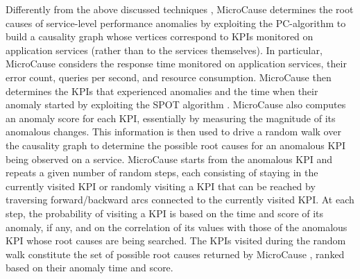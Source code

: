 {%
Differently from the above discussed techniques \cite{29_Wang2018_CloudRanger,07_Ma2019_MSRank,08_Ma2020_AutoMAP,25_Ma2020_MSRankExtended}, MicroCause \cite{05_Meng2020_RootCausesMicroservices} determines the root causes of service-level performance anomalies by exploiting the PC-algorithm \cite{Spirtes2000_CausationPredictionSearchPCAlgoritm} to build a causality graph whose vertices correspond to KPIs monitored on application services (rather than to the services themselves).
In particular, MicroCause \cite{05_Meng2020_RootCausesMicroservices} considers the response time monitored on application services, their error count, queries per second, and resource consumption.
%
MicroCause \cite{05_Meng2020_RootCausesMicroservices} then determines the KPIs that experienced anomalies and the time when their anomaly started by exploiting the SPOT algorithm \cite{Siffer2017_SPOTAlgorithm}.
MicroCause \cite{Siffer2017_SPOTAlgorithm} also computes an anomaly score for each KPI, essentially by measuring the magnitude of its anomalous changes.
This information is then used to drive a random walk over the causality graph to determine the possible root causes for an anomalous KPI being observed on a service.
MicroCause \cite{05_Meng2020_RootCausesMicroservices} starts from the anomalous KPI and repeats a given number of random steps, each consisting of staying in the currently visited KPI or randomly visiting a KPI that can be reached by traversing forward/backward arcs connected to the currently visited KPI.
At each step, the probability of visiting a KPI is based on the time and score of its anomaly, if any, and on the correlation of its values with those of the anomalous KPI whose root causes are being searched.
The KPIs visited during the random walk constitute the set of possible root causes returned by MicroCause \cite{05_Meng2020_RootCausesMicroservices}, ranked based on their anomaly time and score.
}

